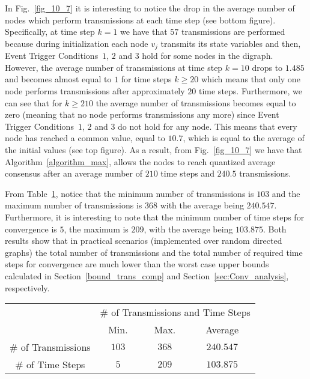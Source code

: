 \documentclass[twocolumn]{autart}    %
\begin{document}
In Fig.~\ref{fig_10_7} it is interesting to notice the drop in the average number of nodes which perform transmissions at each time step (see bottom figure). 
Specifically, at time step $k=1$ we have that $57$ transmissions are performed because during initialization each node $v_j$ transmits its state variables and then, Event Trigger Conditions~$1$, $2$ and $3$ hold for some nodes in the digraph. 
However, the average number of transmissions at time step $k=10$ drops to $1.485$ and becomes almost equal to $1$ for time steps $k \geq 20$ which means that only one node performs transmissions after approximately $20$ time steps. 
Furthermore, we can see that for $k \geq 210$ the average number of transmissions becomes equal to zero (meaning that no node performs transmissions any more) since Event Trigger Conditions~$1$, $2$ and $3$ do not hold for any node. 
This means that every node has reached a common value, equal to $10.7$, which is equal to the average of the initial values (see top figure).
As a result, from Fig.~\ref{fig_10_7} we have that Algorithm~\ref{algorithm_max}, allows the nodes to reach quantized average consensus after an average number of $210$ time steps and $240.5$ transmissions. 


From Table~\ref{table_max_min_10_7}, notice that the minimum number of transmissions is $103$ and the maximum number of transmissions is $368$ with the average being $240.547$. 
Furthermore, it is interesting to note that the minimum number of time steps for convergence is $5$, the maximum is $209$, with the average being $103.875$. 
Both results show that in practical scenarios (implemented over random directed graphs) the total number of transmissions and the total number of required time steps for convergence are much lower than the worst case upper bounds calculated in Section~\ref{bound_trans_comp} and Section~\ref{sec:Conv_analysis}, respectively. 


\begin{table}[t]
\begin{center}
\label{table_max_min_10_7}
{\small 
\begin{tabular}{|c||c|c|c|}
\hline
 &\multicolumn{3}{c|}{$\#$ of Transmissions and Time Steps}\\
 &Min. & Max. & Average \\
\cline{1-4}
$\#$ of Transmissions & $103$ & $368$ & $240.547$\\
$\#$ of Time Steps & $5$ & $209$ & $103.875$\\
\hline
\end{tabular}
}
\end{center}
\end{table}
\vspace{0.2cm}
\end{document}
